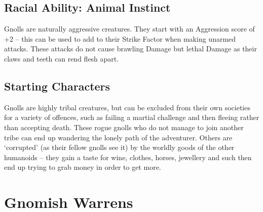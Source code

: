 \begin{multicols}{2}
\subsection{Racial Ability: Animal Instinct}

Gnolls are naturally aggressive creatures. They start with an Aggression score of +2 -- this can be used to add to their Strike Factor when making unarmed attacks. These attacks do not cause brawling Damage but lethal Damage as their claws and teeth can rend flesh apart.

\subsection{Starting Characters}

Gnolls are highly tribal creatures, but can be excluded from their own societies for a variety of offences, such as failing a martial challenge and then fleeing rather than accepting death. These rogue gnolls who do not manage to join another tribe can end up wandering the lonely path of the adventurer. Others are `corrupted' (as their fellow gnolls see it) by the worldly goods of the other humanoids -- they gain a taste for wine, clothes, horses, jewellery and such then end up trying to grab money in order to get more.

\end{multicols}

\section[Gnomes]{Gnomish Warrens}

